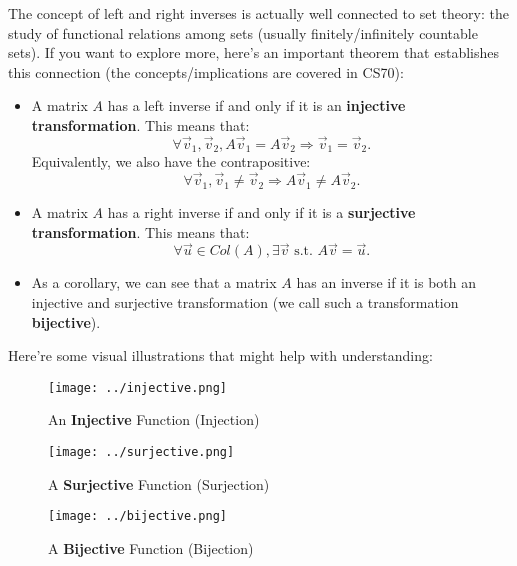 \begin{enumerate}
{{
    \color{NavyBlue}
    The concept of left and right inverses is actually well connected to set theory: the study of functional relations among sets (usually finitely/infinitely countable sets). If you want to explore more, here's an important theorem that establishes this connection (the concepts/implications are covered in CS70):
\begin{itemize}
    \item A matrix $A$ has a left inverse if and only if it is an \textbf{injective transformation}. This means that:
    $$\forall \vec{v}_1, \vec{v}_2, A\vec{v}_1 = A\vec{v}_2 \Rightarrow \vec{v}_1 = \vec{v}_2.$$
    Equivalently, we also have the contrapositive:
    $$\forall \vec{v}_1, \vec{v}_1 \neq \vec{v}_2 \Rightarrow A\vec{v}_1 \neq A\vec{v}_2.$$
    \item A matrix $A$ has a right inverse if and only if it is a \textbf{surjective transformation}. This means that:
    $$\forall \vec{u} \in Col(A), \exists \vec{v} \text{ s.t. } A\vec{v} = \vec{u}.$$
    \item As a corollary, we can see that a matrix $A$ has an inverse if it is both an injective and surjective transformation (we call such a transformation \textbf{bijective}).
\end{itemize}
Here're some visual illustrations that might help with understanding:
\begin{figure}[H]
    \centering
    \begin{minipage}{.3\textwidth}
    \centering
    \texttt{[image: ../injective.png]}
    \caption*{An \textbf{Injective} Function (Injection)}
    \end{minipage}
    \begin{minipage}{.32\textwidth}
    \centering
    \texttt{[image: ../surjective.png]}
    \caption*{A \textbf{Surjective} Function (Surjection)}
    \end{minipage}
    \begin{minipage}{.3\textwidth}
    \centering
    \texttt{[image: ../bijective.png]}
    \caption*{A \textbf{Bijective} Function (Bijection)}
    \end{minipage}
\end{figure}
}
}


\end{enumerate}